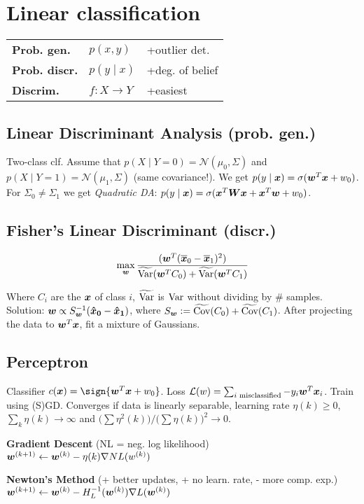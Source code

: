 \section{Linear classification}
\begin{tabular}{lll}
\textbf{Prob. gen.}     & $p(x, y)$ & +outlier det. \\
\textbf{Prob. discr.} & $p(y \mid x)$ & +deg. of belief \\
\textbf{Discrim.}       & $f : X \rightarrow Y$ & +easiest
\end{tabular}


\subsection*{Linear Discriminant Analysis (prob. gen.)}

Two-class clf. Assume that
$p(X \mid Y = 0) = \mathcal{N}(\mu_0, \Sigma)$ and
$p(X \mid Y = 1) = \mathcal{N}(\mu_1, \Sigma)$ (same covariance!).
We get $p(y \mid \boldsymbol{x}) = \sigma(\boldsymbol{w}^T \boldsymbol{x} + w_0)$.
For $\Sigma_0 \neq \Sigma_1$ we get \textit{Quadratic DA}:
$p(y \mid \boldsymbol{x}) = \sigma(\boldsymbol{x}^T\boldsymbol{W}\boldsymbol{x} + \boldsymbol{x}^T\boldsymbol{w} + w_0)$.

\subsection*{Fisher's Linear Discriminant (discr.)}
$$
\max_{\boldsymbol{w}}
    \frac{
        (\boldsymbol{w}^T(\boldsymbol{\overline{x}}_0 - \boldsymbol{\overline{x}}_1)^2)
    }{
        \widetilde{\operatorname{\textrm{Var}}}(\boldsymbol{w}^T C_0) + \widetilde{\operatorname{\textrm{Var}}}(\boldsymbol{w}^T C_1)
    }
$$

Where $C_i$ are the $\boldsymbol{x}$ of class $i$, $\widetilde{\operatorname{\textrm{Var}}}$ is $\operatorname{\textrm{Var}}$ without dividing by \# samples.
Solution: $\boldsymbol{w} \propto S_{\boldsymbol{w}}^{-1}(\boldsymbol{\hat{x}_0} - \boldsymbol{\hat{x}_1})$,
where $S_{\boldsymbol{w}} \vcentcolon= \widetilde{\operatorname{\textrm{Cov}}}(C_0) + \widetilde{\operatorname{\textrm{Cov}}}(C_1)$.
After projecting the data to $\boldsymbol{w}^T\boldsymbol{x}$, fit a mixture of Gaussians.

\subsection*{Perceptron}

Classifier $c(\b{x}) = \sign{\b{w}^T\b{x} + w_0}$.
Loss $\mathcal{L}(w) = \sum_{i \text{ misclassified}} -y_i \boldsymbol{w}^T\boldsymbol{x}_i$.
Train using (S)GD. Converges if data is linearly separable,
learning rate $\eta(k) \geq 0$, $\sum_k\eta(k)\rightarrow\infty$ and
$\big(\sum \eta^2(k)\big)
/
\big(\sum \eta(k)\big)^2
\rightarrow 0$.

\textbf{Gradient Descent} (NL = neg. log likelihood)\\
$\boldsymbol{w}^{(k+1)} \leftarrow \boldsymbol{w}^{(k)} - \eta(k)\nabla NL(w^{(k)})$

\textbf{Newton's Method} (+ better updates, + no learn. rate, - more comp. exp.)\\
$\boldsymbol{w}^{(k+1)} \leftarrow \boldsymbol{w}^{(k)} - H_{L}^{-1}(\boldsymbol{w}^{(k)}) \nabla L(\boldsymbol{w}^{(k)})$

